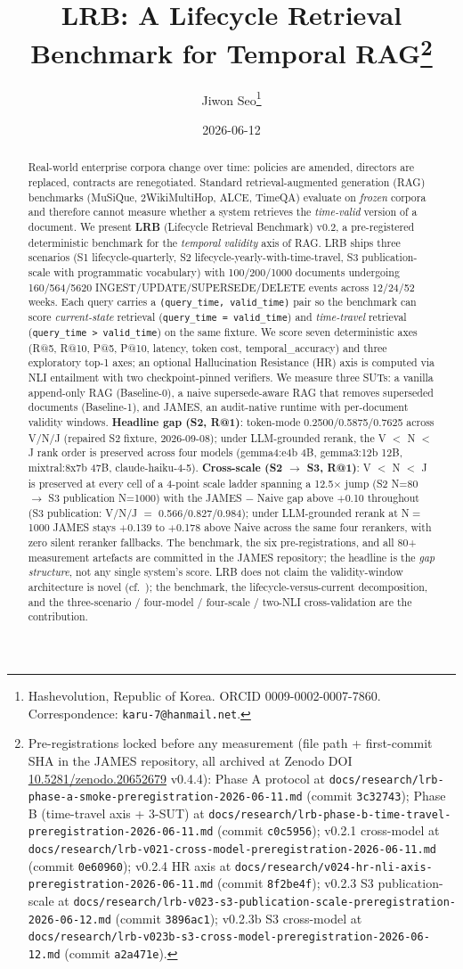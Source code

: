 \documentclass[11pt,a4paper]{article}
\title{LRB: A Lifecycle Retrieval Benchmark for Temporal RAG\thanks{Pre-registrations locked before any measurement (file path + first-commit SHA in the JAMES repository, all archived at Zenodo DOI \href{https://doi.org/10.5281/zenodo.20652679}{10.5281/zenodo.20652679} v0.4.4): Phase A protocol at \texttt{docs/research/lrb-phase-a-smoke-preregistration-2026-06-11.md} (commit \texttt{3c32743}); Phase B (time-travel axis + 3-SUT) at \texttt{docs/research/lrb-phase-b-time-travel-preregistration-2026-06-11.md} (commit \texttt{c0c5956}); v0.2.1 cross-model at \texttt{docs/research/lrb-v021-cross-model-preregistration-2026-06-11.md} (commit \texttt{0e60960}); v0.2.4 HR axis at \texttt{docs/research/v024-hr-nli-axis-preregistration-2026-06-11.md} (commit \texttt{8f2be4f}); v0.2.3 S3 publication-scale at \texttt{docs/research/lrb-v023-s3-publication-scale-preregistration-2026-06-12.md} (commit \texttt{3896ac1}); v0.2.3b S3 cross-model at \texttt{docs/research/lrb-v023b-s3-cross-model-preregistration-2026-06-12.md} (commit \texttt{a2a471e}).}}
\author{
  Jiwon Seo\thanks{Hashevolution, Republic of Korea. ORCID 0009-0002-0007-7860. Correspondence: \texttt{karu-7@hanmail.net}.}
}
\date{2026-06-12}
\begin{document}
\maketitle

\begin{abstract}
Real-world enterprise corpora change over time: policies are amended, directors are replaced, contracts are renegotiated. Standard retrieval-augmented generation (RAG) benchmarks (MuSiQue, 2WikiMultiHop, ALCE, TimeQA) evaluate on \emph{frozen} corpora and therefore cannot measure whether a system retrieves the \emph{time-valid} version of a document. We present \textbf{LRB} (Lifecycle Retrieval Benchmark) v0.2, a pre-registered deterministic benchmark for the \emph{temporal validity} axis of RAG. LRB ships three scenarios (S1 lifecycle-quarterly, S2 lifecycle-yearly-with-time-travel, S3 publication-scale with programmatic vocabulary) with 100/200/1000 documents undergoing 160/564/5620 INGEST/UPDATE/SUPERSEDE/DELETE events across 12/24/52 weeks. Each query carries a \texttt{(query\_time, valid\_time)} pair so the benchmark can score \emph{current-state} retrieval (\texttt{query\_time = valid\_time}) and \emph{time-travel} retrieval (\texttt{query\_time > valid\_time}) on the same fixture. We score seven deterministic axes (R@5, R@10, P@5, P@10, latency, token cost, temporal\_accuracy) and three exploratory top-1 axes; an optional Hallucination Resistance (HR) axis is computed via NLI entailment with two checkpoint-pinned verifiers. We measure three SUTs: a vanilla append-only RAG (Baseline-0), a naive supersede-aware RAG that removes superseded documents (Baseline-1), and JAMES, an audit-native runtime with per-document validity windows. \textbf{Headline gap (S2, R@1)}: token-mode 0.2500/0.5875/0.7625 across V/N/J (repaired S2 fixture, 2026-09-08); under LLM-grounded rerank, the V $<$ N $<$ J rank order is preserved across four models (gemma4:e4b 4B, gemma3:12b 12B, mixtral:8x7b 47B, claude-haiku-4-5). \textbf{Cross-scale (S2 $\to$ S3, R@1)}: V $<$ N $<$ J is preserved at every cell of a 4-point scale ladder spanning a 12.5$\times$ jump (S2 N=80 $\to$ S3 publication N=1000) with the JAMES $-$ Naive gap above $+$0.10 throughout (S3 publication: V/N/J $=$ 0.566/0.827/0.984); under LLM-grounded rerank at N$=$1000 JAMES stays $+$0.139 to $+$0.178 above Naive across the same four rerankers, with zero silent reranker fallbacks. The benchmark, the six pre-registrations, and all 80+ measurement artefacts are committed in the JAMES repository; the headline is the \emph{gap structure}, not any single system's score. LRB does not claim the validity-window architecture is novel (cf.~\cite{nakajima2026activegraph}); the benchmark, the lifecycle-versus-current decomposition, and the three-scenario / four-model / four-scale / two-NLI cross-validation are the contribution.
\end{abstract}
\end{document}
